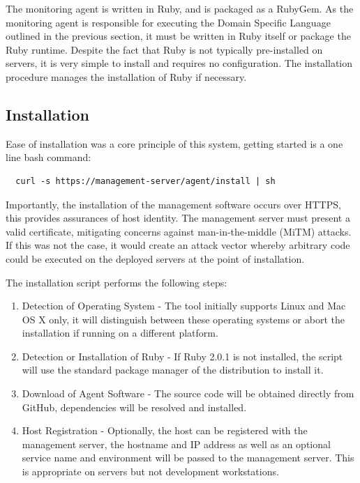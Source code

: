 \documentclass{cshonours}
\begin{document}
The monitoring agent is written in Ruby, and is packaged as a RubyGem. As the monitoring agent is responsible for executing the Domain Specific Language outlined in the previous section, it must be written in Ruby itself or package the Ruby runtime. Despite the fact that Ruby is not typically pre-installed on servers, it is very simple to install and requires no configuration. The installation procedure manages the installation of Ruby if necessary.

\subsection{Installation}

Ease of installation was a core principle of this system, getting started is a one line bash command:

\begin{verbatim}
  curl -s https://management-server/agent/install | sh
\end{verbatim}

Importantly, the installation of the management software occurs over HTTPS, this provides assurances of host identity. The management server must present a valid certificate, mitigating concerns against man-in-the-middle (MiTM) attacks. If this was not the case, it would create an attack vector whereby arbitrary code could be executed on the deployed servers at the point of installation.

The installation script performs the following steps:

\begin{enumerate}
  \item{Detection of Operating System} - The tool initially supports Linux and Mac OS X only, it will distinguish between these operating systems or abort the installation if running on a different platform.
  \item{Detection or Installation of Ruby} - If Ruby 2.0.1 is not installed, the script will use the standard package manager of the distribution to install it.
  \item{Download of Agent Software} - The source code will be obtained directly from GitHub, dependencies will be resolved and installed.
  \item{Host Registration} - Optionally, the host can be registered with the management server, the hostname and IP address as well as an optional service name and environment will be passed to the management server. This is appropriate on servers but not development workstations.
\end{enumerate}
\end{document}
